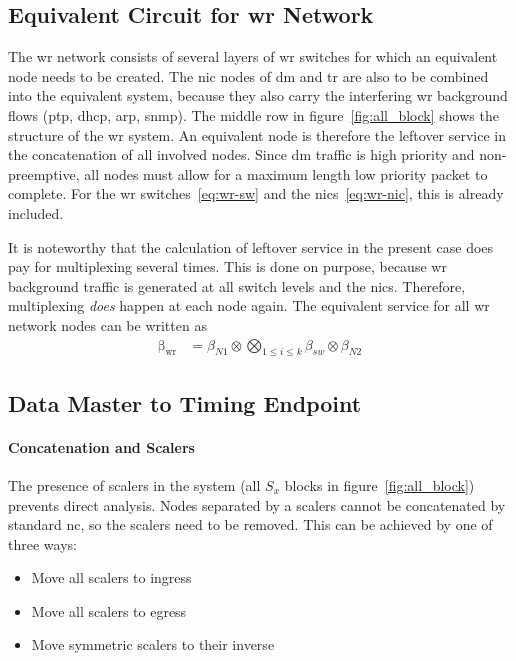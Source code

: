 \subsection{Equivalent Circuit for \gls{wr} Network}
The \gls{wr} network consists of several layers of \gls{wr} switches for which an equivalent node needs to be created. The \gls{nic} nodes of \gls{dm} and \gls{tr} are
also to be combined into the equivalent system, because they also carry the interfering \gls{wr} background flows (\gls{ptp}, \gls{dhcp}, \gls{arp}, \gls{snmp}).
The middle row in figure~\ref{fig:all_block} shows the structure of the \gls{wr} system. An equivalent node is therefore the leftover service
in the concatenation of all involved nodes. Since \gls{dm} traffic is high priority and non-preemptive, all nodes must allow for a maximum length
low priority packet to complete. For the \gls{wr} switches~\ref{eq:wr-sw} and the \gls{nic}s~\ref{eq:wr-nic}, this is already included.
\par
It is noteworthy that the calculation of leftover service in the present case does pay for multiplexing several times.
This is done on purpose, because \gls{wr} background traffic is generated at all
switch levels and the \gls{nic}s. Therefore, multiplexing \emph{does} happen at each node again. The equivalent service for all \gls{wr} network nodes
can be written as
\begin{align}
\mathrm{\beta_{wr}} &= \beta_{N1} \otimes \bigotimes_{1 \le i \le k} \beta_{sw} \otimes \beta_{N2}
\label{eq:wr-serv}
\end{align}


\subsection{Data Master to Timing Endpoint}

\paragraph{Concatenation and Scalers}
The presence of scalers in the system (all $S_x$ blocks in figure~\ref{fig:all_block}) prevents direct analysis.
Nodes separated by a scalers cannot be concatenated by standard \gls{nc}, so the scalers need to be removed.
This can be achieved by one of three ways:
\begin{itemize}
\item{Move all scalers to ingress}
\item{Move all scalers to egress}
\item{Move symmetric scalers to their inverse}
\end{itemize}

